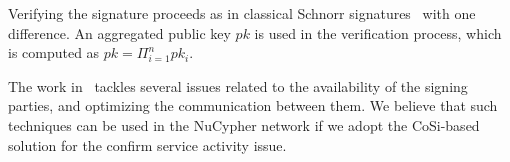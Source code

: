 Verifying the signature proceeds as in classical Schnorr signatures~\cite{schnorr1991efficient} with 
one difference. An aggregated public key $pk$ is used in the verification process, 
which is computed as $pk = \Pi_{i=1}^{n} pk_i$.


The work in~\cite{syta2016keeping} tackles several issues related to 
the availability of the 
signing parties, and optimizing the communication between them. 
We believe that such techniques can be used in the NuCypher network if we adopt the 
CoSi-based solution for the confirm service activity issue.

